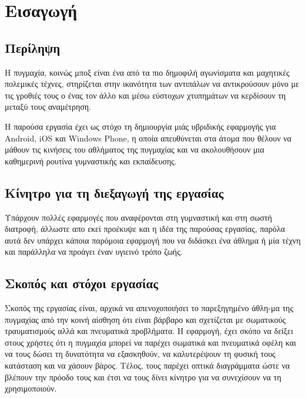 \documentclass[a4paper,12pt]{article}
\begin{document}
	\newpage	
	\tableofcontents
	\listoffigures
	\listoftables

	\newpage
	\section{Εισαγωγή}

		\subsection{Περίληψη}

			Η πυγμαχία, κοινώς μποξ είναι ένα από τα πιο δημοφιλή αγωνίσματα και μαχητικές πολεμικές τέχνες, στηρίζεται στην ικανότητα των αντιπάλων 
			να αντικρούσουν μόνο με τις γροθιές τους ο ένας τον άλλο και μέσω εύστοχων χτυπημάτων να κερδίσουν τη μεταξύ τους αναμέτρηση.

			Η παρούσα εργασία έχει ως στόχο τη δημιουργία μιάς υβριδικής εφαρμογής για Android, 
			iOS και Windows Phone, η οποία απευθύνεται στα άτομα που θέλουν να μάθουν τις κινήσεις του αθλήματος της πυγμαχίας και να ακολουθήσουν 
			μια καθημερινή ρουτίνα γυμναστικής και εκπαίδευσης.

		\subsection{Κίνητρο για τη διεξαγωγή της εργασίας}	

			Υπάρχουν πολλές εφαρμογές που αναφέρονται στη γυμναστική και στη σωστή διατροφή, άλλωστε απο εκεί προέκυψε και η ιδέα της παρούσας εργασίας, 
			παρόλα αυτά δεν υπάρχει κάποια παρόμοια εφαρμογή που να διδάσκει ένα άθλημα ή μία τέχνη και παράλληλα να προάγει έναν υγιεινό τρόπο ζωής. 


		\subsection{Σκοπός και στόχοι εργασίας}	
			
			Σκοπός της εργασίας είναι, αρχικά να απενοχοποιήσει το παρεξηγημένο 
			άθλη-μα της πυγμαχίας από την κοινή αίσθηση ότι είναι βάρβαρο 
			και σχετίζεται με σωματικούς τραυματισμούς αλλά και πνευματικά προβλήματα.
			Η εφαρμογή, έχει σκόπο να δείξει στους χρήστες ότι η πυγμαχία μπορεί να παρέχει σωματικά και πνευματικά οφέλη και 
			να τους δώσει τη δυνατότητα να εξασκηθούν, να καλυτερέψουν τη φυσική τους κατάσταση 
			και να χάσουν βάρος. Τέλος, τους παρέχει οπτικά διαγράμματα ώστε να βλέπουν την πρόοδο τους και έτσι να τους δίνει κίνητρο για να συνεχίσουν
			να τη χρησιμοποιούν.   
\end{document}
